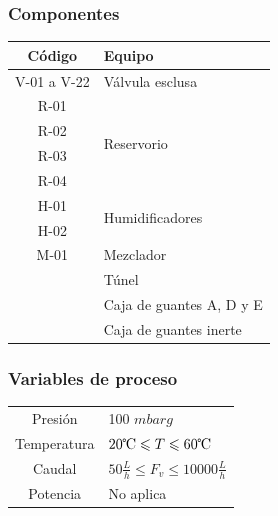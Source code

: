 \documentclass{article}
\begin{document}
\subsubsection*{Componentes}
\begin{table}[H]
\centering
\begin{tabular}{cp{4cm}}
\toprule
Código & Equipo \\
\midrule
V-01 a V-22 & Válvula esclusa \\
\midrule
R-01 & \multirow{4}{*}{Reservorio} \\
R-02 & \\
R-03 & \\
R-04 & \\
\midrule
H-01 & \multirow{2}{*}{Humidificadores} \\
H-02 & \\
\midrule
M-01 & Mezclador \\
\midrule
& Túnel \\
\midrule
& Caja de guantes A, D y E \\
\midrule
& Caja de guantes inerte \\
\bottomrule
\end{tabular}
\end{table}
\subsubsection*{Variables de proceso}
\begin{table}[H]
\centering
\begin{tabular}{cp{3.5cm}}
\toprule
Presión & 100 $mbarg$ \\
Temperatura & $20\celsius\leqslant T \leqslant60\celsius$ \\
Caudal & $50\frac{L}{h}\leqslant F_v \leqslant10000\frac{L}{h}$ \\
Potencia & No aplica \\
\bottomrule
\end{tabular}
\end{table}
\end{document}
